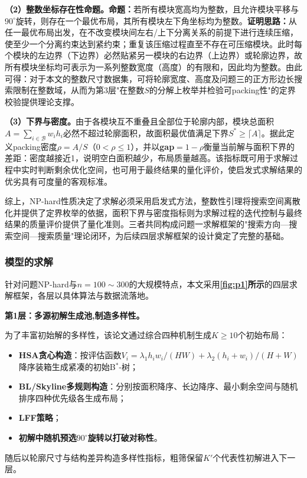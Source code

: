 \documentclass{JXUSTmodeling}
\begin{document}
\textbf{（2）整数坐标存在性命题。}\textbf{命题：}若所有模块宽高均为整数，且允许模块平移与$90^{\circ}$旋转，则存在一个最优布局，其所有模块左下角坐标均为整数。\textbf{证明思路：}从任一最优布局出发，在不改变模块间左右/上下分离关系的前提下进行连续压缩，使至少一个分离约束达到紧约束；重复该压缩过程直至不存在可压缩模块。此时每个模块的左边界（下边界）必然贴紧另一模块的右边界（上边界）或轮廓边界，故所有模块坐标均可表示为一系列整数宽度（高度）的有限和，因此均为整数\cite{yao2001}。由此可得：对于本文的整数尺寸数据集，可将轮廓宽度、高度及问题三的正方形边长搜索限制在整数域，从而为第3层"在整数$S$的分解上枚举并检验可packing性"的定界校验提供理论支撑。

\textbf{（3）下界与密度。}由于各模块互不重叠且全部位于轮廓内部，模块总面积$A=\sum_{i\in\mathcal{B}}w_ih_i$必然不超过轮廓面积，故面积最优值满足下界$S^{\ast}\ge\lceil A\rceil$。据此定义packing密度$\rho=A/S$（$0<\rho\le1$），并以\textbf{gap$=1-\rho$}衡量当前解与面积下界的差距：密度越接近1，说明空白面积越少，布局质量越高。该指标既可用于求解过程中实时判断剩余优化空间，也可用于最终结果的量化评价，使启发式求解结果的优劣具有可度量的客观标准。

综上，NP-hard性质决定了求解必须采用启发式方法，整数性引理将搜索空间离散化并提供了定界枚举的依据，面积下界与密度指标则为求解过程的迭代控制与最终结果的质量评价提供了量化准则。三者共同构成问题一求解框架的"搜索方向—搜索空间—搜索质量"理论闭环，为后续四层求解框架的设计奠定了完整的基础。

\subsubsection{模型的求解}
针对问题NP-hard与$n=100\sim300$的大规模特点，本文采用\textbf{\ref{fig:p1}所示}的四层求解框架，各层以具体算法与数据流落地。

\textbf{第1层：多源初解生成池,制造多样性。}

为了丰富初始解的多样性，该论文通过综合四种机制生成$K\ge10$个初始布局：\begin{itemize}\item[(1)] \textbf{HSA贪心构造}：按评估函数$V_i=\lambda_1 h_iw_i/(HW)+\lambda_2(h_i+w_i)/(H+W)$降序装箱生成紧凑的初始B${}^{\ast}$-树\cite{chen2011hybrid}；\item[(2)] \textbf{BL/Skyline多规则构造}：分别按面积降序、长边降序、最小剩余空间与随机排序四种优先级各生成布局；\item[(3)] \textbf{LFF策略}；\item[(4)] \textbf{初解中随机预选$90^{\circ}$旋转以打破对称性}。\end{itemize}随后以轮廓尺寸与结构差异构造多样性指标，粗筛保留$K'$个代表性初解进入下一层。
\end{document}
